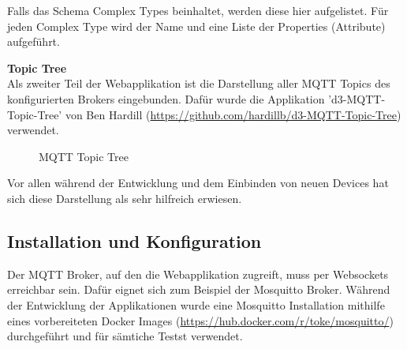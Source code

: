 {Falls das Schema Complex Types beinhaltet, werden diese hier aufgelistet. Für jeden Complex Type wird der Name und eine Liste der Properties (Attribute) aufgeführt.

\textbf{Topic Tree} \\

Als zweiter Teil der Webapplikation ist die Darstellung aller MQTT Topics des konfigurierten Brokers eingebunden. Dafür wurde die Applikation 'd3-MQTT-Topic-Tree' von Ben Hardill (\url{https://github.com/hardillb/d3-MQTT-Topic-Tree}) verwendet.

\begin{figure}[H]
	\centering
    \caption{MQTT Topic Tree}
\end{figure}

Vor allen während der Entwicklung und dem Einbinden von neuen Devices hat sich diese Darstellung als sehr hilfreich erwiesen.

\subsection{Installation und Konfiguration}
Der MQTT Broker, auf den die Webapplikation zugreift, muss per Websockets erreichbar sein. Dafür eignet sich zum Beispiel der Mosquitto Broker. Während der Entwicklung der Applikationen wurde eine Mosquitto Installation mithilfe eines vorbereiteten Docker Images (\url{https://hub.docker.com/r/toke/mosquitto/}) durchgeführt und für sämtiche Testst verwendet.

}
